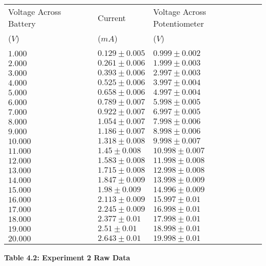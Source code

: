 \documentclass[
	letterpaper, %
	10pt, %
]{CSUniSchoolLabReport}
\begin{document}
\begin{center}
	\begin{tabular}{ | l | l | l | }
		\hline
		Voltage Across Battery&Current& Voltage Across Potentiometer\\
		($V$) & ($mA$) & ($V$)\\
		 & & \\
		\hline
		$1.000$&$0.129\pm0.005$&$0.999\pm0.002$\\
		$2.000$&$0.261\pm0.006$&$1.999\pm0.003$\\
		$3.000$&$0.393\pm0.006$&$2.997\pm0.003$\\
		$4.000$&$0.525\pm0.006$&$3.997\pm0.004$\\
		$5.000$&$0.658\pm0.006$&$4.997\pm0.004$\\
		$6.000$&$0.789\pm0.007$&$5.998\pm0.005$\\
		$7.000$&$0.922\pm0.007$&$6.997\pm0.005$\\
		$8.000$&$1.054\pm0.007$&$7.998\pm0.006$\\
		$9.000$&$1.186\pm0.007$&$8.998\pm0.006$\\
		$10.000$&$1.318\pm0.008$&$9.998\pm0.007$\\
		$11.000$&$1.45\pm0.008$&$10.998\pm0.007$\\
		$12.000$&$1.583\pm0.008$&$11.998\pm0.008$\\
		$13.000$&$1.715\pm0.008$&$12.998\pm0.008$\\
		$14.000$&$1.847\pm0.009$&$13.998\pm0.009$\\
		$15.000$&$1.98\pm0.009$&$14.996\pm0.009$\\
		$16.000$&$2.113\pm0.009$&$15.997\pm0.01$\\
		$17.000$&$2.245\pm0.009$&$16.998\pm0.01$\\
		$18.000$&$2.377\pm0.01$&$17.998\pm0.01$\\
		$19.000$&$2.51\pm0.01$&$18.998\pm0.01$\\
		$20.000$&$2.643\pm0.01$&$19.998\pm0.01$\\
		\hline
	\end{tabular}
\end{center}
\begin{center}
    \textbf{Table 4.2: Experiment 2 Raw Data}\\
\end{center}
\end{document}
